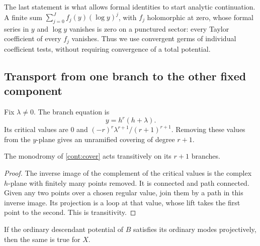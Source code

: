The last statement is what allows formal identities to start
analytic continuation. A finite sum
$\sum_{j=0}^J f_j(y)(\log y)^j$, with $f_j$ holomorphic at zero,
whose formal series in $y$ and $\log y$ vanishes is zero on a
punctured sector: every Taylor coefficient of every $f_j$
vanishes. Thus we use convergent germs of individual coefficient
tests, without requiring convergence of a total potential.

\subsection{Transport from one branch to the other fixed component}

Fix $\lambda\neq0$. The branch equation is
\begin{equation}
               y=h^r(h+\lambda).
 \label{cont:cover}
\end{equation}
Its critical values are $0$ and
$(-r)^r\lambda^{r+1}/(r+1)^{r+1}$. Removing these values from
the $y$-plane gives an unramified covering of degree $r+1$.

\begin{lemma}
\label{cont:monodromy}
The monodromy of \eqref{cont:cover} acts transitively on its
$r+1$ branches.
\end{lemma}

\begin{proof}
The inverse image of the complement of the critical values is
the complex $h$-plane with finitely many points removed. It is
connected and path connected. Given any two points over a
chosen regular value, join them by a path in this inverse
image. Its projection is a loop at that value, whose lift
takes the first point to the second. This is transitivity.
\end{proof}

\begin{proposition}
\label{cont:projective-transfer}
If the ordinary descendant potential of $B$ satisfies its
ordinary modes projectively, then the same is true for $X$.
\end{proposition}

